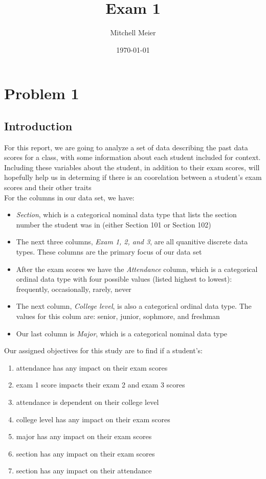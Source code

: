 \documentclass[14pt]{article}
\title{Exam 1}
\author{Mitchell Meier}
\date{\today}
\begin{document}
\maketitle

\section*{Problem 1}
\subsection*{Introduction}
For this report, we are going to analyze a set of data describing the past data scores for a class, with some information about each student included for context. Including these variables about the student, in addition to their exam scores, will hopefully help us in determing if there is an coorelation between a student's exam scores and their other traits \\

\noindent For the columns in our data set, we have:

\begin{itemize}
\item \emph{Section}, which is a categorical nominal data type that lists the section number the student was in (either Section 101 or Section 102)
\item The next three columns, \emph{Exam 1, 2, and 3}, are all quanitive discrete data types. These columns are the primary focus of our data set
\item After the exam scores we have the \emph{Attendance} column, which is a categorical ordinal data type with four possible values (listed highest to lowest): frequently, occasionally, rarely, never
\item The next column, \emph{College level}, is also a categorical ordinal data type. The values for this colum are: senior, junior, sophmore, and freshman
\item Our last column is \emph{Major}, which is a categorical nominal data type \\
\end{itemize}
\pagebreak

\noindent Our assigned objectives for this study are to find if a student's:

\begin{enumerate}
\item attendance has any impact on their exam scores
\item exam 1 score impacts their exam 2 and exam 3 scores
\item attendance is dependent on their college level
\item college level has any impact on their exam scores
\item major has any impact on their exam scores
\item section has any impact on their exam scores
\item section has any impact on their attendance 
\end{enumerate} 
\end{document}
